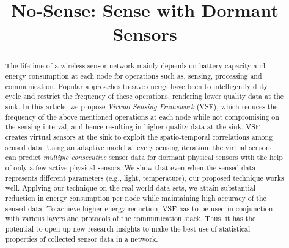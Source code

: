\documentclass[a4paper,conference]{IEEEtran}
\begin{document}
\title{No-Sense: Sense with Dormant Sensors}


\author{
}












\maketitle


\begin{abstract}
The lifetime of a wireless sensor network mainly depends on battery capacity and energy consumption at each node for operations such as, sensing, processing and communication. Popular approaches to save energy have been to intelligently duty cycle and restrict the frequency of these operations, rendering lower quality data at the sink. In this article, we propose \emph{Virtual Sensing Framework} (VSF), which reduces the frequency of the above mentioned operations at each node while not compromising on the sensing interval, and hence resulting in higher quality data at the sink. VSF creates virtual sensors at the sink to exploit the spatio-temporal correlations among sensed data. Using an adaptive model at every sensing iteration, the virtual sensors can predict \textit{multiple consecutive} sensor data for dormant physical sensors with the help of only a few active physical sensors. We show that even when the sensed data represents different parameters (e.g., light, temperature), our proposed technique works well. Applying our technique on the real-world data sets, we attain substantial reduction in energy consumption per node while maintaining high accuracy of the sensed data. To achieve higher energy reduction, VSF has to be used in conjunction with various layers and protocols of the communication stack. Thus, it has the potential to open up new research insights to make the best use of statistical properties of collected sensor data in a network.
\end{abstract}





\IEEEpeerreviewmaketitle
\end{document}
